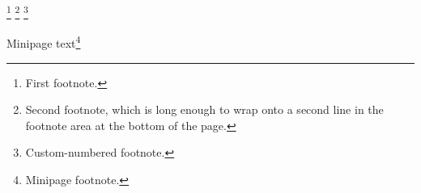 \documentclass{article}
\begin{document}
\lipsum[1]\footnote{First footnote.} \lipsum[2][1-3]\footnote{Second footnote, which is long enough to wrap onto a second line in the footnote area at the bottom of the page.}
\lipsum[3]\footnote[42]{Custom-numbered footnote.}
\begin{minipage}{.8\linewidth}Minipage text\footnote{Minipage footnote.}\end{minipage}
\end{document}
